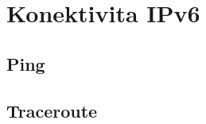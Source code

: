 \documentclass[czech,master,dept460,male,cpp,cpdeclaration]{diploma}
\begin{document}
\newpage
\section{Konektivita IPv6}
\label{sec:Sec12}

\subsection{Ping}
\label{sec:Sec121}

\subsection{Traceroute}
\label{sec:Sec121}
\end{document}
